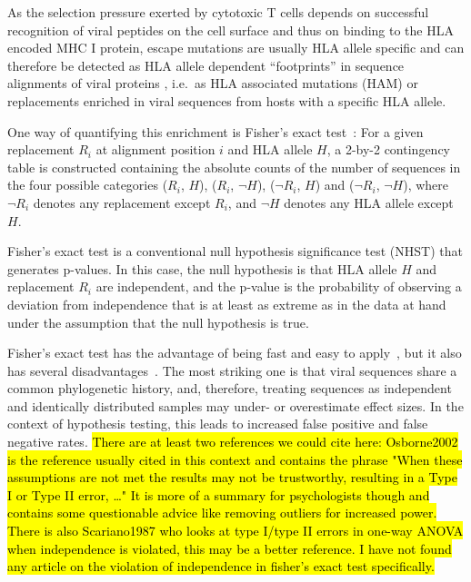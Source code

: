 \documentclass{bioinfo}
\begin{document}
As the selection pressure exerted by cytotoxic T cells depends on successful recognition of viral peptides on the cell surface and thus on binding to the HLA encoded MHC I protein, escape mutations are usually HLA allele specific and can therefore be detected as HLA allele dependent ``footprints'' in sequence alignments of viral proteins  \citep{Moore2002}, i.e.\ as HLA associated mutations (HAM) or replacements enriched in viral sequences from hosts with a specific HLA allele.

One way of quantifying this enrichment is Fisher's exact test~\citep{Fisher1922}: For a given replacement \(R_{i}\) at alignment position \(i\) and HLA allele \(H\), a 2-by-2 contingency table is constructed containing the absolute counts of the number of sequences in the four possible categories  (\(R_{i}\), \(H\)), (\(R_{i}\), \(\neg H\)), (\(\neg R_{i}\), \(H\)) and (\(\neg R_{i}\), \(\neg H\)), where \(\neg R_{i}\) denotes any replacement except \(R_{i}\), and \(\neg H\) denotes any HLA allele except \(H\).

Fisher's exact test is a conventional null hypothesis significance test (NHST) that generates p-values. In this case, the null hypothesis is that HLA allele \(H\) and  replacement \(R_{i}\) are independent, and the p-value is the probability of observing a deviation from independence that is at least as extreme as in the data at hand under the assumption that the null hypothesis is true.

Fisher's exact test has the advantage of being fast and easy to apply~\citep{Budeus2016}, but it also has several disadvantages~\citep{Carlson2008}. The most striking one is that viral sequences share a common phylogenetic history, and,  therefore, treating sequences as independent and identically distributed samples may under- or overestimate effect sizes. In the context of hypothesis testing, this leads to increased false positive and false negative rates. \hl{There are at least two references we could cite here: Osborne2002 is the reference usually cited in this context and contains the phrase "When these assumptions are not met the results may not be trustworthy, resulting in a Type I or Type II error, \dots" It is more of a summary for psychologists though and contains some questionable advice like removing outliers for increased power. There is also Scariano1987 who looks at type I/type II errors in one-way ANOVA when independence is violated, this may be a better reference. I have not found any article on the violation of independence in fisher's exact test specifically.} \citep{Osborne2002} \citep{Scariano1987}
\end{document}
